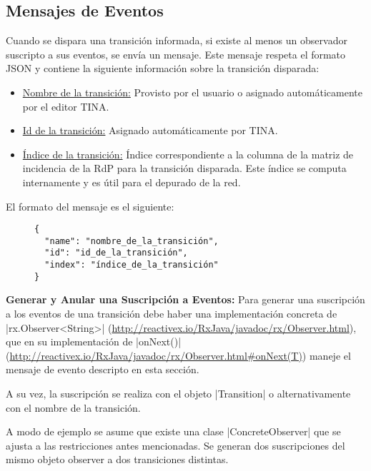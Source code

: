 \subsection{Mensajes de Eventos}
\label{mensaje_eventos}

Cuando se dispara una transición informada, si existe al menos un observador
suscripto a sus eventos, se envía un mensaje. Este mensaje respeta el formato
JSON y contiene la siguiente información sobre la transición disparada:

\begin{itemize}
    \item \underline{Nombre de la transición:} Provisto por el usuario o
    asignado automáticamente por el editor TINA.
    \item \underline{Id de la transición:} Asignado automáticamente por TINA.
    \item \underline{Índice de la transición:} Índice correspondiente a la
    columna de la matriz de incidencia de la RdP para la transición disparada.
    Este índice se computa internamente y es útil para el depurado de la red.
\end{itemize}

El formato del mensaje es el siguiente:

\begin{figure}[H]
\centering
\begin{verbatim}
{
  "name": "nombre_de_la_transición",
  "id": "id_de_la_transición",
  "index": "índice_de_la_transición"
}
\end{verbatim}
\end{figure}

\textbf{Generar y Anular una Suscripción a Eventos:}
Para generar una suscripción a los eventos de una transición debe haber una
implementación concreta de |rx.Observer<String>|
(\url{http://reactivex.io/RxJava/javadoc/rx/Observer.html}), que en su
implementación de |onNext()| 
(\url{http://reactivex.io/RxJava/javadoc/rx/Observer.html#onNext(T)})
maneje el mensaje de evento descripto en esta sección.

A su vez, la suscripción se realiza con el objeto |Transition| o
alternativamente con el nombre de la transición.

A modo de ejemplo se asume que existe una clase |ConcreteObserver|
que se ajusta a las restricciones antes mencionadas. Se generan dos
suscripciones del mismo objeto observer a dos transiciones distintas.

